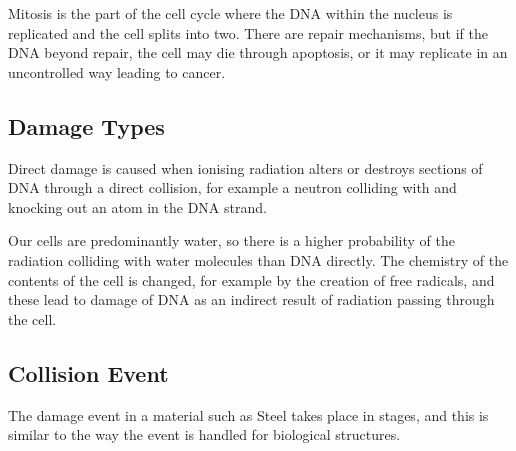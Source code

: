 Mitosis is the part of the cell cycle where the DNA within the nucleus is replicated and the cell splits into two.  There are repair mechanisms, but if the DNA beyond repair, the cell may die through apoptosis, or it may replicate in an uncontrolled way leading to cancer.


\subsection{Damage Types}

Direct damage is caused when ionising radiation alters or destroys sections of DNA through a direct collision, for example a neutron colliding with and knocking out an atom in the DNA strand.

Our cells are predominantly water, so there is a higher probability of the radiation colliding with water molecules than DNA directly.  The chemistry of the contents of the cell is changed, for example by the creation of free radicals, and these lead to damage of DNA as an indirect result of radiation passing through the cell.

\subsection{Collision Event}

The damage event in a material such as Steel takes place in stages, and this is similar to the way the event is handled for biological structures.

\begin{figure}[tbp]
\centering
{}
\caption{}
\label{fig:decaychain}
\end{figure}














